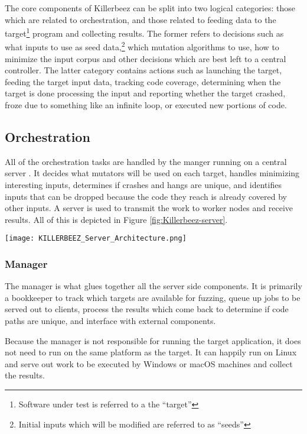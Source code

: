 The core components of Killerbeez can be split into two logical categories:
those which are related to orchestration, and those related to feeding data
to the target\footnote{Software under test is referred to a the ``target''}
program and collecting results.  The former refers to decisions such as what
inputs to use as seed data,\footnote{Initial inputs which will be modified
are referred to as ``seeds''} which mutation algorithms to use, how to minimize
the input corpus and other decisions which are best left to a central
controller.  The latter category contains actions such as launching the target,
feeding the target input data, tracking code coverage, determining when the target is
done processing the input and reporting whether the target crashed, froze due
to something like an infinite loop, or executed new portions of code.

\subsection{Orchestration}
All of the orchestration tasks are handled by the manger running on a central
server .  It decides what mutators will be used on each target,
handles minimizing interesting inputs, determines if crashes
and hangs are unique, and identifies inputs that can be dropped because the code they
reach is already covered by other inputs. A \BOINC{} server is used to transmit
the work to worker nodes and receive results.  All of this is depicted in
Figure \ref{fig:Killerbeez-server}.

\begin{figure*}[htb]
\centering
\texttt{[image: KILLERBEEZ\_Server\_Architecture.png]}
\caption{Killerbeez Server Architecture}
\label{fig:Killerbeez-server}
\end{figure*}

\subsubsection{Manager} \label{Manager Overview}
The manager is what glues together all the server side components.  It is
primarily a bookkeeper to track which targets are available for fuzzing,
queue up jobs to be served out to \BOINC{} clients, process the results which come back to
determine if code paths are unique, and interface with external components.

Because the manager is not responsible for running the target application, it
does not need to run on the same platform as the target.  It can happily run on Linux and
serve out work to be executed by Windows or macOS machines and collect the
results.

